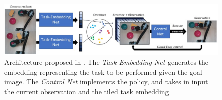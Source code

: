 \begin{figure}[t]
    \centering
    \includegraphics[width=\textwidth]{figures/images/task_embedded/task_embedded.png}
    \caption{Architecture proposed in \cite{james2018task_embedded}. The \textit{Task Embedding Net} generates the embedding representing the task to be performed given the goal image. The \textit{Control Net} implements the policy, and takes in input the current observation and the tiled task embedding}
    \label{fig:task_embedded}
\end{figure}
